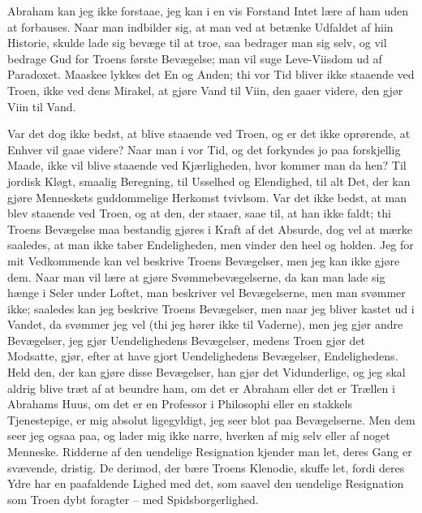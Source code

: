 \documentclass[12pt,a4paper]{article}
\begin{document}
Abraham kan jeg ikke forstaae, jeg kan i en vis Forstand Intet lære af ham uden at forbauses. Naar man indbilder sig, at man ved at betænke Udfaldet af hiin Historie, skulde lade sig bevæge til at troe, saa bedrager man sig selv, og vil bedrage Gud for Troens første Bevægelse; man vil suge Leve-Viisdom ud af Paradoxet. Maaskee lykkes det En og Anden; thi vor Tid bliver ikke staaende ved Troen, ikke ved dens Mirakel, at gjøre Vand til Viin, den gaaer videre, den gjør Viin til Vand.

Var det dog ikke bedst, at blive staaende ved Troen, og er det ikke oprørende, at Enhver vil gaae videre? Naar man i vor Tid, og det forkyndes jo paa forskjellig Maade, ikke vil blive staaende ved Kjærligheden, hvor kommer man da hen? Til jordisk Kløgt, smaalig Beregning, til Usselhed og Elendighed, til alt Det, der kan gjøre Menneskets guddommelige Herkomst tvivlsom. Var det ikke bedst, at man blev staaende ved Troen, og at den, der staaer, saae til, at han ikke faldt; thi Troens Bevægelse maa bestandig gjøres i Kraft af det Absurde, dog vel at mærke saaledes, at man ikke taber Endeligheden, men vinder den heel og holden. Jeg for mit Vedkommende kan vel beskrive Troens Bevægelser, men jeg kan ikke gjøre dem. Naar man vil lære at gjøre Svømmebevægelserne, da kan man lade sig hænge i Seler under Loftet, man beskriver vel Bevægelserne, men man svømmer ikke; saaledes kan jeg beskrive Troens Bevægelser, men naar jeg bliver kastet ud i Vandet, da svømmer jeg vel (thi jeg hører ikke til Vaderne), men jeg gjør andre Bevægelser, jeg gjør Uendelighedens Bevægelser, medens Troen gjør det Modsatte, gjør, efter at have gjort Uendelighedens Bevægelser, Endelighedens. Held den, der kan gjøre disse Bevægelser, han gjør det Vidunderlige, og jeg skal aldrig blive træt af at beundre ham, om det er Abraham eller det er Trællen i Abrahams Huus, om det er en Professor i Philosophi eller en stakkels Tjenestepige, er mig absolut ligegyldigt, jeg seer blot paa Bevægelserne. Men dem seer jeg ogsaa paa, og lader mig ikke narre, hverken af mig selv eller af noget Menneske. Ridderne af den uendelige Resignation kjender man let, deres Gang er svævende, dristig. De derimod, der bære Troens Klenodie, skuffe let, fordi deres Ydre har en paafaldende Lighed med det, som saavel den uendelige Resignation som Troen dybt foragter – med Spidsborgerlighed.
\end{document}
